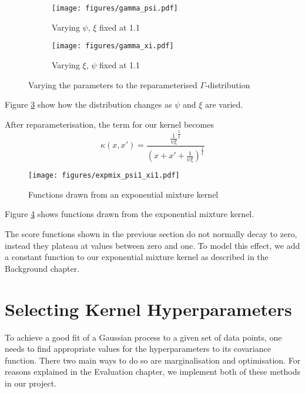 \documentclass[a4paper,12pt,twoside,openright]{report}
\begin{document}
\begin{figure}
\centering
\begin{subfigure}{.5\textwidth}
  \centering
  \texttt{[image: figures/gamma\_psi.pdf]}
  \caption{Varying $\psi$, $\xi$ fixed at 1.1}
  \label{gammapsi}
\end{subfigure}%
\begin{subfigure}{.5\textwidth}
  \centering
  \texttt{[image: figures/gamma\_xi.pdf]}
  \caption{Varying $\xi$, $\psi$ fixed at 1.1}
  \label{gammaxi}
\end{subfigure}
\caption{Varying the parameters to the reparameterised $\Gamma$-distribution}
\label{gammadist}
\end{figure}


Figure \ref{gammadist} show how the distribution changes as $\psi$ and $\xi$ are varied.

After reparameterisation, the term for our kernel becomes
\begin{equation}
\kappa(x, x') = \frac{\frac{1}{\psi\xi}^{\frac{1}{\xi}}}{(x+x'+\frac{1}{\psi\xi})^{\frac{1}{\xi}}}
\end{equation}

\begin{figure}
\centering

  \centering
  \texttt{[image: figures/expmix\_psi1\_xi1.pdf]}
  \caption{Functions drawn from an exponential mixture kernel}
  \label{expmix11}
\end{figure}

Figure \ref{expmix11} shows functions drawn from the exponential mixture kernel. %

The score functions shown in the previous section do not normally decay to zero, instead they plateau at values between zero and one. To model this effect, we add a constant function to our exponential mixture kernel as described in the Background chapter.

\section{Selecting Kernel Hyperparameters} 


To achieve a good fit of a Gaussian process to a given set of data points, one needs to find appropriate values for the hyperparameters to its covariance function. There two main ways to do so are marginalisation and optimisation. For reasons explained in the Evaluation chapter, we implement both of these methods in our project.
\end{document}
